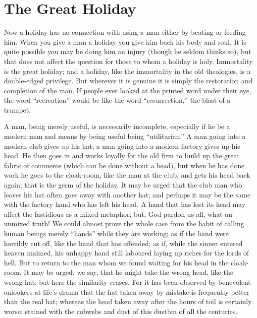 \documentclass{book}
\begin{document}
\section{The Great Holiday}
Now a holiday has no connection with using a man either by beating or feeding him. When you give a man a holiday you give him back his body and soul. It is quite possible you may be doing him an injury (though he seldom thinks so), but that does not affect the question for those to whom a holiday is holy. Immortality is the great holiday; and a holiday, like the immortality in the old theologies, is a double-edged privilege. But wherever it is genuine it is simply the restoration and completion of the man. If people ever looked at the printed word under their eye, the word “recreation” would be like the word “resurrection,” the blast of a trumpet.

A man, being merely useful, is necessarily incomplete, especially if he be a modern man and means by being useful being “utilitarian.” A man going into a modern club gives up his hat; a man going into a modern factory gives up his head. He then goes in and works loyally for the old firm to build up the great fabric of commerce (which can be done without a head), but when he has done work he goes to the cloak-room, like the man at the club, and gets his head back again; that is the germ of the holiday. It may be urged that the club man who leaves his hat often goes away with another hat; and perhaps it may be the same with the factory hand who has left his head. A hand that has lost its head may affect the fastidious as a mixed metaphor; but, God pardon us all, what an unmixed truth! We could almost prove the whole case from the habit of calling human beings merely “hands” while they are working; as if the hand were horribly cut off, like the hand that has offended; as if, while the sinner entered heaven maimed, his unhappy hand still laboured laying up riches for the lords of hell. But to return to the man whom we found waiting for his head in the cloak-room. It may be urged, we say, that he might take the wrong head, like the wrong hat; but here the similarity ceases. For it has been observed by benevolent onlookers at life’s drama that the hat taken away by mistake is frequently better than the real hat; whereas the head taken away after the hours of toil is certainly worse: stained with the cobwebs and dust of this dustbin of all the centuries.
\end{document}
